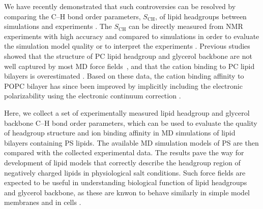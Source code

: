 \documentclass[aps,prl,superscriptaddress,twocolumn]{revtex4}
\begin{document}
We have recently demonstrated that such controversies can be resolved by
comparing the C--H bond order parameters, $S_\mathrm{CH}$, of lipid headgroups between simulations
and experiments \cite{botan15,catte16}. The $S_\mathrm{CH}$ can be directly
measured from NMR experiments with high accuracy and compared to simulations
in order to evaluate the simulation model quality or to interpret the experiments \cite{ollila16}.
Previous studies showed that the structure of PC lipid headgroup and glycerol backbone are not well
captured by most MD force fields~\cite{botan15}, and that the cation binding to PC
lipid bilayers is overestimated \cite{catte16}.
%
Based on these data, the cation binding affinity to POPC bilayer has since been improved by implicitly including the electronic polarizability using the electronic continuum correction \cite{melcr18}.

Here, we collect a set of experimentally measured lipid headgroup and
glycerol backbone C--H bond order parameters, which can be used to
evaluate the quality of headgroup structure and ion binding affinity
in MD simulations of lipid bilayers containing PS lipids. 
The available MD simulation models of PS are then compared with
the collected experimental data.
The results pave the way
for development of lipid models that correctly describe 
the headgroup region of negatively charged lipids in physiological salt
conditions. Such force fields are expected to be useful in understanding
biological function of lipid headgroups and glycerol backbone, as
these are knwon to behave similarly in simple model membranes and in cells \cite{gally81,scherer87,seelig90}.
\end{document}
